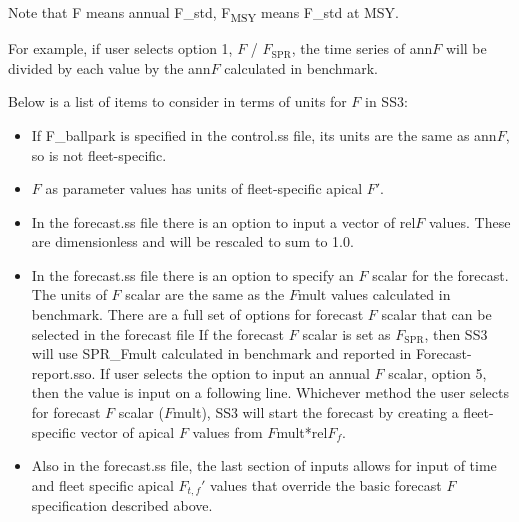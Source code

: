 Note that F means annual F\_std, F\textsubscript{MSY} means F\_std at MSY.

For example, if user selects option 1, $F$ / $F_\text{SPR}$, the time series of ann$F$ will be divided by each value by the ann$F$ calculated in benchmark.

Below is a list of items to consider in terms of units for $F$ in SS3:
\begin{itemize}
	\item If F\_ballpark is specified in the control.ss file, its units are the same as ann$F$, so is not fleet-specific.
	
	\item $F$ as parameter values has units of fleet-specific apical $F'$.
	
	\item In the forecast.ss file there is an option to input a vector of rel$F$ values. These are dimensionless and will be rescaled to sum to 1.0.
	
	\item In the forecast.ss file there is an option to specify an $F$ scalar for the forecast.  The units of $F$ scalar are the same as the $F$mult values calculated in benchmark.  There are a full set of options for forecast $F$ scalar that can be selected in the forecast file 
	If the forecast $F$ scalar is set as $F_\text{SPR}$, then SS3 will use SPR\_Fmult calculated in benchmark and reported in Forecast-report.sso.  If user selects the option to input an annual $F$ scalar, option 5, then the value is input on a following line.  Whichever method the user selects for forecast $F$ scalar ($F$mult), SS3 will start the forecast by creating a fleet-specific vector of apical $F$ values from $F$mult*rel$F_f$.
	
	\item Also in the forecast.ss file, the last section of inputs allows for input of time and fleet specific apical $F_{t,f}'$ values that override the basic forecast $F$ specification described above.
\end{itemize}